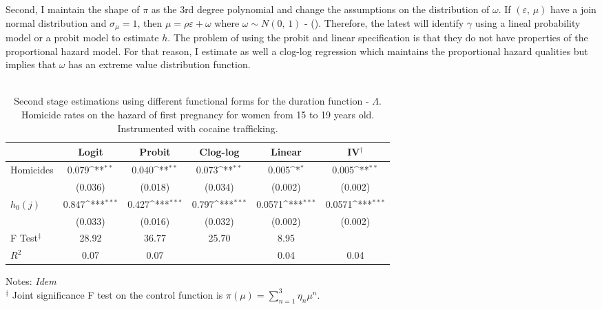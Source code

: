 \documentclass[a4paper,10pt,twocolumn,preprint,3p,authoryear]{elsarticle}
\def\sym#1{\ifmmode^{#1}\else\(^{#1}\)\fi}
\begin{document}
\begin{appendix}
Second, I maintain the shape of $\pi$ as the 3rd degree polynomial and change the assumptions on the distribution of $\omega$. If $\left(\varepsilon,\,\mu\right)$ have a join normal distribution and $\sigma_{\mu}=1$, then $\mu=\rho\varepsilon+\omega$ where $\omega\sim N\left(0,\,1\right)$ - (\citet{BlundellPowell2004}).  Therefore, the latest will identify $\gamma$ using a lineal probability model or a probit model to estimate $h$. The problem of using the probit and linear specification is that they do not have properties of the proportional hazard model. For that reason, I estimate as well a clog-log regression which maintains the proportional hazard qualities but implies that $\omega$ has an extreme value distribution function.  

\begin{table}[h]
	\caption{\\ 
		Second stage estimations using different functional forms for the duration function - $\Lambda$. Homicide rates on the hazard of first pregnancy for women from 15 to 19 years old. Instrumented with cocaine trafficking.}
	\footnotesize	
	\begin{tabular}{lccccc}
		\hline				
		&	Logit&                     Probit&                     Clog-log&	Linear& IV$^{\dagger}$ \\
	  \hline	  
Homicides        &	0.079\sym{**} &      0.040\sym{**} &      0.073\sym{**} &	     0.005\sym{*}  &	     0.005\sym{**} \\	
&	(0.036)         &     (0.018)         &     (0.034)         &	     (0.002)         &	     (0.002)         \\	
$h_{0}\left( j \right)$        &	0.847\sym{***}&       0.427\sym{***}&       0.797\sym{***}&	      0.0571\sym{***}&	      0.0571\sym{***}\\	
&	(0.033)         &     (0.016)         &     (0.032)         &	     (0.002)         &	     (0.002)         \\	
\hline				
F Test$^{\ddagger}$       &	28.92         &       36.77         &       25.70         &	        8.95         &	                     \\	
$R^{2}$        &	0.07         &        0.07         &                     &	                    0.04 &	                0.04     \\	
\hline 			
	\end{tabular}
	\begin{minipage}[t]{1\columnwidth}%
		  \begin{spacing}{1}
		  \noindent 
		  {Notes: \emph{Idem} \\
			$^{\ddagger}$ Joint significance F test on the control function is $\pi\left( \mu \right) = \sum_{n=1}^{3}\eta_{n}\mu^{n}$.} 		 
		  \end{spacing}
	  \end{minipage}
	\label{tab:DiscreteModelPreg2OverFunctionalForm}
\end{table}


\end{appendix}
\end{document}
